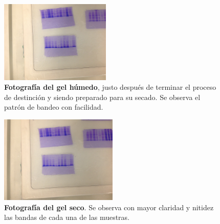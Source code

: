 \documentclass[%
 reprint,
 amsmath,amssymb,
 aps,
showkeys,
letter,
12pts
]{revtex4-1}
\begin{document}
		\begin{figure}
		\includegraphics[width=0.47\textwidth]{foto5.JPG}
		\caption{\textbf{Fotografía del gel húmedo}, justo después de terminar el proceso de destinción y siendo preparado para su secado. Se observa el patrón de bandeo con facilidad.}
		\label{Imagen:gelI}
		\end{figure} 
		
		\begin{figure}
		\includegraphics[width=0.5\textwidth]{foto4.JPG}
		\caption{\textbf{Fotografía del gel seco}. Se observa con mayor claridad y nitidez las bandas de cada una de las muestras.}
		\label{Imagen:gelII}
		\end{figure} 
	
\end{document}
